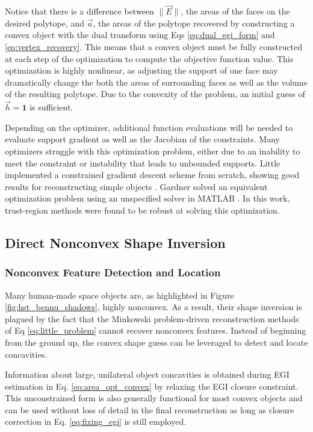 Notice that there is a difference between $ \| \vec{E} \| $, the areas of the faces on the desired polytope, and $\vec{a}$, the areas of the polytope recovered by constructing a convex object with the dual transform using Eqs \ref{eq:dual_egi_form} and \ref{eq:vertex_recovery}. This means that a convex object must be fully constructed at each step of the optimization to compute the objective function value. This optimization is highly nonlinear, as adjusting the support of one face may dramatically change the both the areas of surrounding faces as well as the volume of the resulting polytope. Due to the convexity of the problem, an initial guess of $\vec{h} = \mathbf{1}$ is sufficient.

Depending on the optimizer, additional function evaluations will be needed to evaluate support gradient as well as the Jacobian of the constraints. Many optimizers struggle with this optimization problem, either due to an inability to meet the constraint or instability that leads to unbounded supports. Little implemented a constrained gradient descent scheme from scratch, showing good results for reconstructing simple objects \cite{little1983}. Gardner solved an equivalent optimization problem using an unspecified solver in MATLAB \cite{gardner2003}. In this work, trust-region methods \cite{conn2000} were found to be robust at solving this optimization.

\subsection{Direct Nonconvex Shape Inversion}

\subsubsection{Nonconvex Feature Detection and Location}

Many human-made space objects are, as highlighted in Figure \ref{fig:hst_bennu_shadows}, highly nonconvex. As a result, their shape inversion is plagued by the fact that the Minkowski problem-driven reconstruction methods of Eq \ref{eq:little_problem} cannot recover nonconvex features. Instead of beginning from the ground up, the convex shape guess can be leveraged to detect and locate concavities.

Information about large, unilateral object concavities is obtained during EGI estimation in Eq. \ref{eq:area_opt_convex} by relaxing the EGI closure constraint. This unconstrained form is also generally functional for most convex objects and can be used without loss of detail in the final reconstruction as long as closure correction in Eq. \ref{eq:fixing_egi} is still employed.

